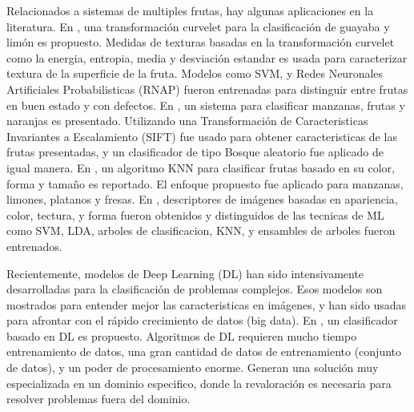 \documentclass[twoside,spanish,ESP,MSc]{plantillaLabUPV}
\theoremstyle{definition}
\begin{document}
Relacionados a sistemas de multiples frutas, hay algunas aplicaciones en la literatura. En \cite{khoje}, una transformación curvelet para la clasificación de guayaba y limón es propuesto. Medidas de texturas basadas en la transformación curvelet como la energia, entropia, media y desviación estandar es usada para caracterizar textura de la superficie de la fruta. Modelos como SVM, y Redes Neuronales Artificiales  Probabilisticas (RNAP) fueron entrenadas para distinguir entre frutas en buen estado y con defectos. 
En \cite{7086191}, un sistema para clasificar manzanas, frutas y naranjas es presentado. Utilizando una Transformación de Caracteristicas Invariantes a Escalamiento (SIFT) fue usado para obtener caracteristicas de las frutas presentadas, y un clasificador de tipo Bosque aleatorio fue aplicado de igual manera. 
En \cite{5254804}, un algoritmo KNN para clasificar frutas basado en su color, forma y tamaño es reportado. El enfoque propuesto fue aplicado para manzanas, limones, platanos y fresas. En \cite{ROCHA201096}, descriptores de imágenes basadas en apariencia, color, tectura, y forma fueron obtenidos y distinguidos de las tecnicas de ML como SVM, LDA, arboles de clasificacion, KNN, y ensambles de arboles fueron entrenados.




Recientemente, modelos de Deep Learning (DL) han sido intensivamente desarrolladas para la clasificación de problemas complejos. Esos modelos son mostrados para entender mejor las caracteristicas en imágenes, y han sido usadas para afrontar con el rápido crecimiento de datos (big data). En \cite{8488544}, un clasificador basado en DL es propuesto. Algoritmos de DL requieren mucho tiempo entrenamiento de datos, una gran cantidad de datos de entrenamiento (conjunto de datos), y un poder de procesamiento enorme. Generan una solución muy especializada en un dominio especifico, donde la revaloración es necesaria para resolver problemas fuera del dominio.



\end{document}
